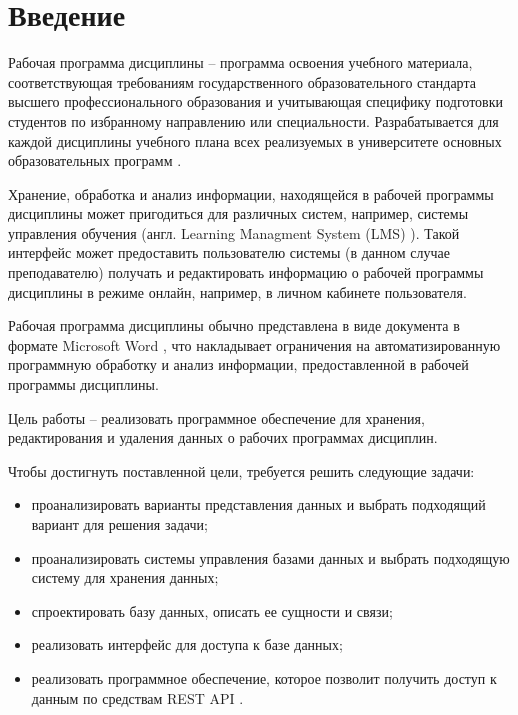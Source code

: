 \chapter*{Введение}

Рабочая программа дисциплины -- программа освоения учебного материала, соответствующая требованиям государственного образовательного стандарта высшего профессионального образования и учитывающая специфику подготовки студентов по избранному направлению или специальности. Разрабатывается для каждой дисциплины учебного плана всех реализуемых в университете основных образовательных программ \cite{rpd-about}.

Хранение, обработка и анализ информации, находящейся в рабочей программы дисциплины может пригодиться для различных систем, например, системы управления обучения (англ. Learning Managment System (LMS) \cite{lms}). Такой интерфейс может предоставить пользователю системы (в данном случае преподавателю) получать и редактировать информацию о рабочей программы дисциплины в режиме онлайн, например, в личном кабинете пользователя.

Рабочая программа дисциплины обычно представлена в виде документа в формате Microsoft Word \cite{ms-word}, что накладывает ограничения на автоматизированную программную обработку и анализ информации, предоставленной в рабочей программы дисциплины.

Цель работы -- реализовать программное обеспечение для хранения, редактирования и удаления данных о рабочих программах дисциплин. 

Чтобы достигнуть поставленной цели, требуется решить следующие задачи:

\begin{itemize}
    \item проанализировать варианты представления данных и выбрать подходящий вариант для решения задачи;
    \item проанализировать системы управления базами данных и выбрать подходящую систему для хранения данных;
    \item спроектировать базу данных, описать ее сущности и связи;
    \item реализовать интерфейс для доступа к базе данных;
    \item реализовать программное обеспечение, которое позволит получить доступ к данным по средствам REST API \cite{rest-api}.
\end{itemize}
